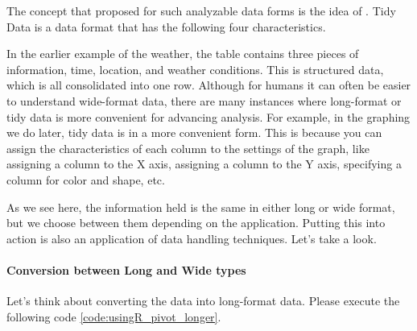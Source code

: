 \documentclass{ltjsbook}
\begin{document}
The concept that \textcite{Hadley2014} proposed for such analyzable data forms is the idea of . Tidy Data is a data format that has the following four characteristics.

In the earlier example of the weather, the table contains three pieces of information, time, location, and weather conditions. This is structured data, which is all consolidated into one row.
Although for humans it can often be easier to understand wide-format data, there are many instances where long-format or tidy data is more convenient for advancing analysis. For example, in the graphing we do later, tidy data is in a more convenient form. This is because you can assign the characteristics of each column to the settings of the graph, like assigning a column to the X axis, assigning a column to the Y axis, specifying a column for color and shape, etc.

As we see here, the information held is the same in either long or wide format, but we choose between them depending on the application. Putting this into action is also an application of data handling techniques. Let's take a look.

\paragraph{Conversion between Long and Wide types}
Let's think about converting the data into long-format data. Please execute the following code \ref{code:usingR_pivot_longer}.

\end{document}
